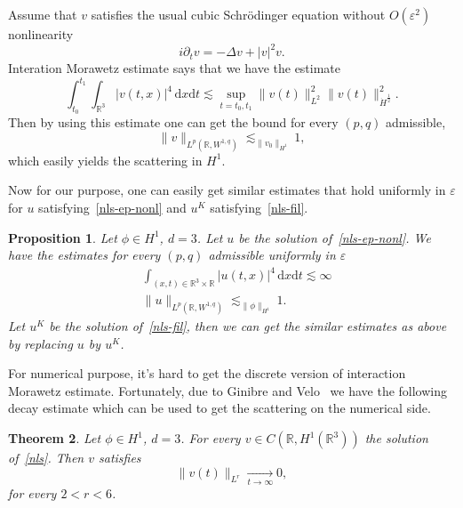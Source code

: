 \documentclass[10pt,a4paper]{article}
\newtheorem{theorem}{Theorem}[section]
\newtheorem{proposition}[theorem]{Proposition}
\begin{document}
  Assume that \(v\) satisfies the usual cubic Schr\"odinger equation without 
  \(O(\varepsilon^2)\) nonlinearity
  \begin{equation}\label{nls}
    i\partial_t v = -\Delta v + |v|^2 v.
  \end{equation}
  Interation Morawetz estimate says that we have the estimate 
  \[ \int_{t_0}^{t_1}\int_{\mathbb R^3} |v(t,x)|^4\,\mathrm{d}x\mathrm{d}t
  \lesssim \sup_{t=t_0,t_1} \|v(t)\|^2_{L^2}\|v(t)\|^2_{\dot{H}^\frac12}.\]
  Then by using this estimate one can get the bound for every \((p,q)\)
  admissible,
  \[ \|v\|_{L^p(\mathbb R,W^{1,q})} \lesssim_{\|v_0\|_{H^1}} 1,\]
  which easily yields the scattering in \(H^1\).

  Now for our purpose, one can easily get similar estimates that hold uniformly in
  \(\varepsilon\) for \(u\) satisfying~\eqref{nls-ep-nonl} and
  \(u^K\) satisfying~\eqref{nls-fil}. 
  \begin{proposition}\label{S1}
    Let \(\phi \in H^1\), \( d = 3 \). Let \( u \) be the solution 
    of~\eqref{nls-ep-nonl}. We have the estimates for every \((p,q)\) admissible 
    uniformly in \(\varepsilon\)
    \begin{equation}
      \begin{aligned}
        & \int_{(x,t)\in\mathbb R^3\times\mathbb R} |u(t,x)|^4\,\mathrm{d}x\mathrm{d}t
        \lesssim \infty \\ 
        & \|u\|_{L^p(\mathbb R,W^{1,q})} \lesssim_{\|\phi\|_{H^1}} 1.
      \end{aligned}
    \end{equation}
    Let \(u^K\) be the solution of~\eqref{nls-fil}, then we can get the similar
    estimates as above by replacing \(u\) by \(u^K\).
  \end{proposition}

  For numerical purpose, it's hard to get the discrete version of
  interaction Morawetz estimate. Fortunately, due to Ginibre and
  Velo~\cite{GiVl85b} we have the following decay estimate which can be used to
  get the scattering on the numerical side. 
  \begin{theorem}
    Let \(\phi \in H^1\), \( d = 3 \). For every \(v\in C(\mathbb R,H^1(\mathbb
    R^3))\) the solution of~\eqref{nls}. Then \(v\) satisfies 
    \[ \|v(t)\|_{L^r} \underset{t \to \infty}{\longrightarrow} 0, \]
    for every \(2 < r < 6\).
  \end{theorem}
\end{document}
